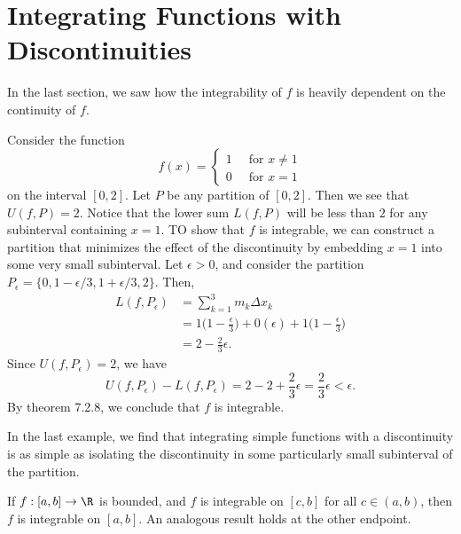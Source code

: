 \section{Integrating Functions with Discontinuities}

In the last section, we saw how the integrability of \( f  \) is heavily dependent on the continuity of \( f  \). 
\begin{ex}
Consider the function
\[  f(x) = 
\begin{cases}
	1 \ &\text{ for } x \neq 1 \\
	0 \ &\text{ for } x = 1
\end{cases} \] on the interval \( [0,2]  \). Let \( P  \) be any partition of \( [0,2] \). Then we see that \( U(f,P) = 2  \). Notice that the lower sum \( L(f,P ) \) will be less than \( 2  \) for any subinterval containing \( x = 1  \). TO show that \( f  \) is integrable, we can construct a partition that minimizes the effect of the discontinuity by embedding \( x = 1  \) into some very small subinterval.
Let \( \epsilon > 0  \), and consider the partition \( P_{\epsilon } = \{ 0, 1 - \epsilon / 3, 1 + \epsilon / 3, 2  \}. \) Then, 
\begin{align*}
    L(f, P_{\epsilon }) &= \sum_{ k=1 }^{ 3 } m_{k} \Delta x_{k} \\
						&= 1 \Big( 1 - \frac{ \epsilon  }{ 3 }  \Big) + 0(\epsilon ) + 1 \Big( 1 - \frac{ \epsilon  }{ 3 }  \Big) \\
						&= 2 - \frac{ 2 }{ 3 } \epsilon.
\end{align*}
Since \( U(f, P_{\epsilon }) = 2  \), we have 
\[  U(f, P_{\epsilon }) - L(f, P_{\epsilon }) = 2 - 2 +  \frac{ 2  }{ 3  } \epsilon = \frac{  2 }{ 3  } \epsilon < \epsilon. \] By theorem 7.2.8, we conclude that \( f  \) is integrable.
\end{ex}

In the last example, we find that integrating simple functions with a discontinuity is as simple as isolating the discontinuity in some particularly small subinterval of the partition. 

\begin{tcolorbox}
\begin{thm}
	If \( f: [a,b] \to \R  \) is bounded, and \( f  \) is integrable on \( [c,b] \) for all \( c \in (a,b)  \), then \( f  \) is integrable on \( [a,b]  \). An analogous result holds at the other endpoint. 
\end{thm}
\end{tcolorbox}

